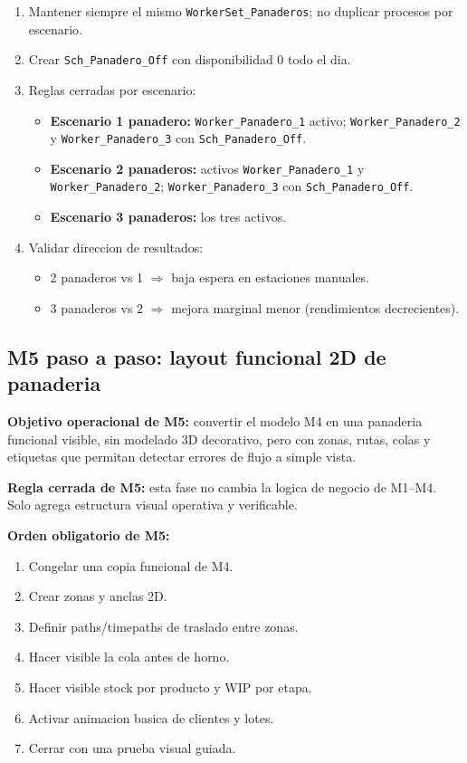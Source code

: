\documentclass[11pt]{article}
\newcommand{\simio}[1]{\texttt{#1}}
\begin{document}
\begin{enumerate}
  \item Mantener siempre el mismo \simio{WorkerSet\_Panaderos}; no duplicar procesos por escenario.
  \item Crear \simio{Sch\_Panadero\_Off} con disponibilidad 0 todo el dia.
  \item Reglas cerradas por escenario:
  \begin{itemize}
    \item \textbf{Escenario 1 panadero:} \simio{Worker\_Panadero\_1} activo; \simio{Worker\_Panadero\_2} y \simio{Worker\_Panadero\_3} con \simio{Sch\_Panadero\_Off}.
    \item \textbf{Escenario 2 panaderos:} activos \simio{Worker\_Panadero\_1} y \simio{Worker\_Panadero\_2}; \simio{Worker\_Panadero\_3} con \simio{Sch\_Panadero\_Off}.
    \item \textbf{Escenario 3 panaderos:} los tres activos.
  \end{itemize}
  \item Validar direccion de resultados:
  \begin{itemize}
    \item 2 panaderos vs 1 \(\Rightarrow\) baja espera en estaciones manuales.
    \item 3 panaderos vs 2 \(\Rightarrow\) mejora marginal menor (rendimientos decrecientes).
  \end{itemize}
\end{enumerate}

\subsection{M5 paso a paso: layout funcional 2D de panaderia}

\textbf{Objetivo operacional de M5:} convertir el modelo M4 en una panaderia funcional visible, sin modelado 3D decorativo, pero con zonas, rutas, colas y etiquetas que permitan detectar errores de flujo a simple vista.

\textbf{Regla cerrada de M5:} esta fase no cambia la logica de negocio de M1--M4. Solo agrega estructura visual operativa y verificable.

\textbf{Orden obligatorio de M5:}
\begin{enumerate}
  \item Congelar una copia funcional de M4.
  \item Crear zonas y anclas 2D.
  \item Definir paths/timepaths de traslado entre zonas.
  \item Hacer visible la cola antes de horno.
  \item Hacer visible stock por producto y WIP por etapa.
  \item Activar animacion basica de clientes y lotes.
  \item Cerrar con una prueba visual guiada.
\end{enumerate}
\end{document}
